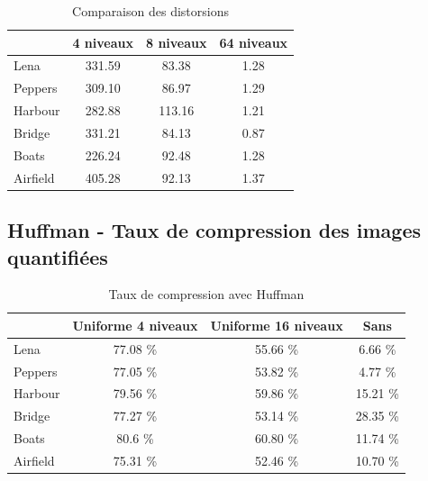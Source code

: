 \documentclass[a4paper, 12pt]{article}
\begin{document}
\begin{table}[H]
	\centering
		\begin{tabular}{l|c|c|c|}
			\cline{2-4}
			                               & 4 niveaux & 8 niveaux & 64 niveaux \\
			\hline
			\multicolumn{1}{|l|}{Lena}     & 331.59    &  83.38    & 1.28       \\
			\hline
			\multicolumn{1}{|l|}{Peppers}  & 309.10    &  86.97    & 1.29       \\
			\hline
			\multicolumn{1}{|l|}{Harbour}  & 282.88    &  113.16   & 1.21       \\
			\hline
			\multicolumn{1}{|l|}{Bridge}   & 331.21    &  84.13    & 0.87       \\
			\hline
			\multicolumn{1}{|l|}{Boats}    & 226.24    &  92.48    & 1.28       \\
			\hline
			\multicolumn{1}{|l|}{Airfield} & 405.28    &  92.13    & 1.37       \\
			\hline
		\end{tabular}
	\caption{Comparaison des distorsions}
	\label{tab:TableComparaisonDistoUniforme}
\end{table}

\subsection{Huffman - Taux de compression des images quantifiées}


\begin{table}[H]
	\centering
		\begin{tabular}{l|c|c|c|}
			\cline{2-4}
			                               & Uniforme 4 niveaux & Uniforme 16 niveaux       & Sans      \\
			\hline
			\multicolumn{1}{|l|}{Lena}     & 77.08 \%           & 55.66 \%                  & 6.66 \%   \\
			\hline
			\multicolumn{1}{|l|}{Peppers}  & 77.05 \%           & 53.82 \%                  & 4.77 \%   \\
			\hline
			\multicolumn{1}{|l|}{Harbour}  & 79.56 \%           & 59.86 \%                  & 15.21 \%  \\
			\hline
			\multicolumn{1}{|l|}{Bridge}   & 77.27 \%           & 53.14 \%                  & 28.35 \%  \\
			\hline
			\multicolumn{1}{|l|}{Boats}    & 80.6 \%            & 60.80 \%                  & 11.74 \%  \\
			\hline
			\multicolumn{1}{|l|}{Airfield} & 75.31 \%           & 52.46 \%                  & 10.70 \%  \\
			\hline
		\end{tabular}
	\caption{Taux de compression avec Huffman}
	\label{tab:TableComparaisonTauxCompressionUniforme}
\end{table}
\end{document}
